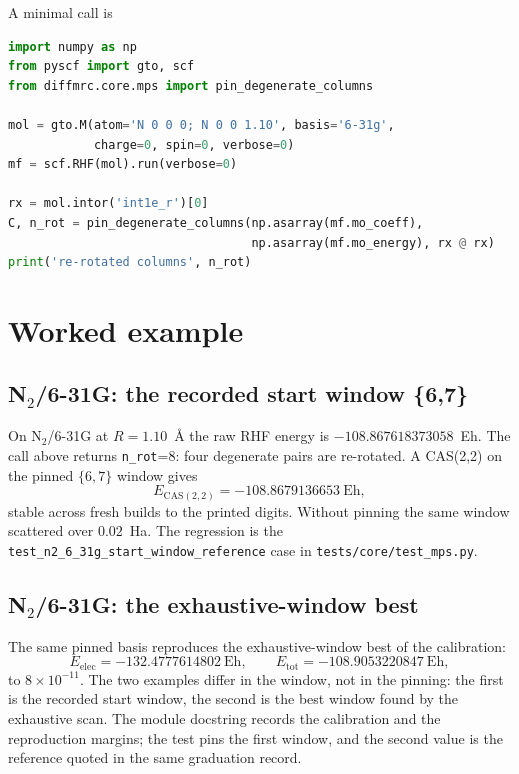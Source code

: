 A minimal call is
\begin{lstlisting}[language=Python]
import numpy as np
from pyscf import gto, scf
from diffmrc.core.mps import pin_degenerate_columns

mol = gto.M(atom='N 0 0 0; N 0 0 1.10', basis='6-31g',
            charge=0, spin=0, verbose=0)
mf = scf.RHF(mol).run(verbose=0)

rx = mol.intor('int1e_r')[0]
C, n_rot = pin_degenerate_columns(np.asarray(mf.mo_coeff),
                                  np.asarray(mf.mo_energy), rx @ rx)
print('re-rotated columns', n_rot)
\end{lstlisting}

\section{Worked example}
\label{sec:pin-example}

\subsection{N\texorpdfstring{$_2$}{2}/6-31G: the recorded start window
\{6,7\}}

On N$_2$/6-31G at $R=1.10$~\AA{} the raw RHF energy is
$-108.867618373058$~Eh.  The call above returns \texttt{n\_rot}=8:
four degenerate pairs are re-rotated.  A CAS(2,2) on the pinned
$\{6,7\}$ window gives
\begin{equation}
  E_{\mathrm{CAS(2,2)}} = -108.8679136653~\text{Eh},
  \label{eq:pin-n2-window}
\end{equation}
stable across fresh builds to the printed digits.  Without pinning the
same window scattered over $0.02$~Ha.  The regression is the
\texttt{test\_n2\_6\_31g\_start\_window\_reference} case in
\texttt{tests/core/test\_mps.py}.

\subsection{N\texorpdfstring{$_2$}{2}/6-31G: the exhaustive-window
best}

The same pinned basis reproduces the exhaustive-window best of the
calibration:
\begin{equation}
  E_{\mathrm{elec}} = -132.4777614802~\text{Eh},
  \qquad
  E_{\mathrm{tot}} = -108.9053220847~\text{Eh},
  \label{eq:pin-n2-best}
\end{equation}
to $8\times10^{-11}$.  The two examples differ in the window, not in
the pinning: the first is the recorded start window, the second is the
best window found by the exhaustive scan.  The module docstring records
the calibration and the reproduction margins; the test pins the first
window, and the second value is the reference quoted in the same
graduation record.

